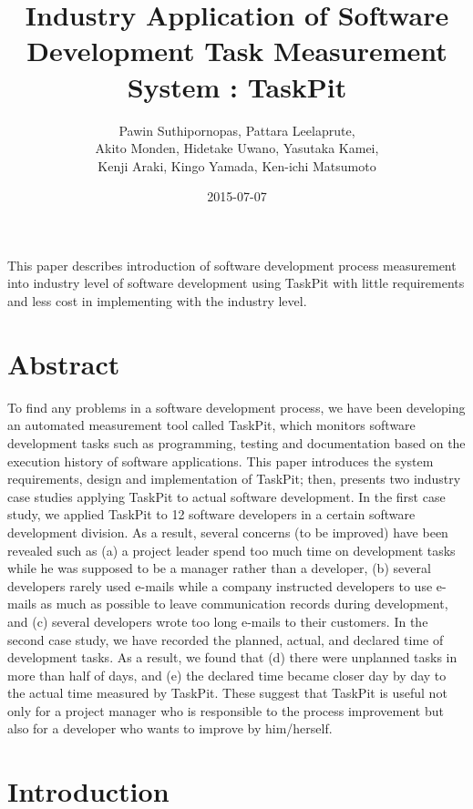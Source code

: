 \documentclass [paper]{ieice}
\title {Industry Application of Software Development Task Measurement System : TaskPit}
\author{Pawin Suthipornopas,
		Pattara Leelaprute, \\
		Akito Monden, 
		Hidetake Uwano, 
		Yasutaka Kamei, \\
		Kenji Araki, 
		Kingo Yamada, 
		Ken-ichi Matsumoto}
\date {2015-07-07}
\begin{document}
\maketitle
\begin {summary}
	This paper describes introduction of software development process measurement into industry level of software development using TaskPit with little requirements and less cost in implementing with the industry level.
\end {summary}

\section {Abstract}
	To find any problems in a software development process, we have been developing an automated measurement tool called TaskPit, which monitors software development tasks such as programming, testing and documentation based on the execution history of software applications. This paper introduces the system requirements, design and implementation of TaskPit; then, presents two industry case studies applying TaskPit to actual software development. In the first case study, we applied TaskPit to 12 software developers in a certain software development division. As a result, several concerns (to be improved) have been revealed such as (a) a project leader spend too much time on development tasks while he was supposed to be a manager rather than a developer, (b) several developers rarely used e-mails while a company instructed developers to use e-mails as much as possible to leave communication records during development, and (c) several developers wrote too long e-mails to their customers. In the second case study, we have recorded the planned, actual, and declared time of development tasks. As a result, we found that (d) there were unplanned tasks in more than half of days, and (e) the declared time became closer day by day to the actual time measured by TaskPit. These suggest that TaskPit is useful not only for a project manager who is responsible to the process improvement but also for a developer who wants to improve by him/herself.
\section {Introduction}
	
\end{document}
